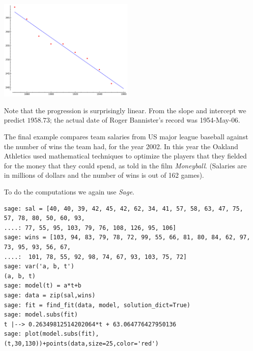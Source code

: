 \begin{center}
  \includegraphics[width=0.5\textwidth]{four_minute_mile.pdf}
\end{center}
Note that the progression is surprisingly linear.
From the slope and intercept we predict $1958.73$; 
the actual date of Roger Bannister's record was 1954-May-06.

The final example
compares team salaries from US major league baseball 
against the number of wins the team had, for the year 2002.
In this year the Oakland Athletics 
used mathematical techniques to optimize the players that they fielded
for the money that they could spend, as told in  
the film \textit{Moneyball}.
(Salaries are in millions of dollars and the number of wins
is out of 162 games). 

To do the computations we again use \textit{Sage}. 
\begin{lstlisting}
sage: sal = [40, 40, 39, 42, 45, 42, 62, 34, 41, 57, 58, 63, 47, 75, 57, 78, 80, 50, 60, 93, 
....: 77, 55, 95, 103, 79, 76, 108, 126, 95, 106]
sage: wins = [103, 94, 83, 79, 78, 72, 99, 55, 66, 81, 80, 84, 62, 97, 73, 95, 93, 56, 67, 
....:  101, 78, 55, 92, 98, 74, 67, 93, 103, 75, 72]
sage: var('a, b, t')
(a, b, t)
sage: model(t) = a*t+b
sage: data = zip(sal,wins)
sage: fit = find_fit(data, model, solution_dict=True)
sage: model.subs(fit)
t |--> 0.26349812514202064*t + 63.064776427950136
sage: plot(model.subs(fit),(t,30,130))+points(data,size=25,color='red')
\end{lstlisting}

